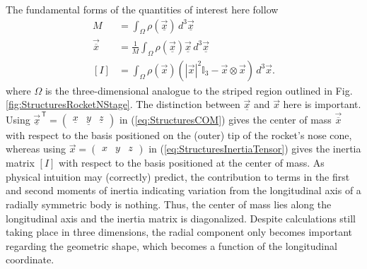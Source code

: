 \documentclass[11pt,dvipsnames]{thesis}
\begin{document}
The fundamental forms of the quantities of interest here follow
\begin{align}
M &= \int_\Omega \rho(\vec{\underline{x}}) \,d^3\vec{\underline{x}} \label{eq:StructuresMass} \\
\vec{\overline{x}} &= \frac{1}{M}\int_\Omega \rho(\vec{\underline{x}}) \vec{\underline{x}} \,d^3\vec{\underline{x}} \label{eq:StructuresCOM} \\
[I] &= \int_\Omega \rho(\vec{x}) (|\vec{x}|^2 \mathbb{I}_{3} - \vec{x} \otimes \vec{x}) \,d^3\vec{x}. \label{eq:StructuresInertiaTensor}
\end{align}
where $\Omega$ is the three-dimensional analogue to the striped region outlined in Fig. \ref{fig:StructuresRocketNStage}. The distinction between $\vec{\underline{x}}$ and $\vec{x}$ here is important. Using $\vec{\underline{x}}^{\,\mathsf{T}} = \begin{pmatrix}\underline{x} & \underline{y} & \underline{z}\end{pmatrix}$ in (\ref{eq:StructuresCOM}) gives the center of mass $\vec{\overline{x}}$ with respect to the basis positioned on the (outer) tip of the rocket's nose cone, whereas using $\vec{x} = \begin{pmatrix}x & y & z\end{pmatrix}$ in (\ref{eq:StructuresInertiaTensor}) gives the inertia matrix $[I]$ with respect to the basis positioned at the center of mass.
As physical intuition may (correctly) predict, the contribution to terms in the first and second moments of inertia indicating variation from the longitudinal axis of a radially symmetric body is nothing. Thus, the center of mass lies along the longitudinal axis and the inertia matrix is diagonalized. Despite calculations still taking place in three dimensions, the radial component only becomes important regarding the geometric shape, which becomes a function of the longitudinal coordinate.
\end{document}
